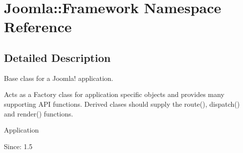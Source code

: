 \hypertarget{namespaceJoomla_1_1Framework}{
\section{Joomla::Framework Namespace Reference}
\label{namespaceJoomla_1_1Framework}
}




\subsection{Detailed Description}
Base class for a Joomla! application.

Acts as a Factory class for application specific objects and provides many supporting API functions. Derived clases should supply the route(), dispatch() and render() functions.

Application \begin{Desc}
\item[Since:]1.5 \end{Desc}
